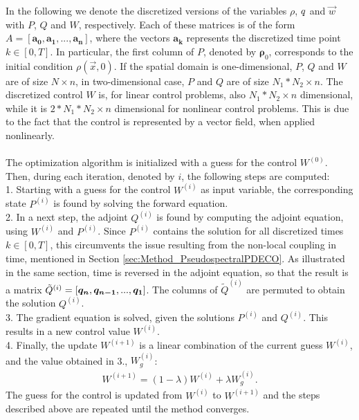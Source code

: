 In the following we denote the discretized versions of the variables $\rho$, $q$ and $\vec{w}$ with $P$, $Q$ and $W$, respectively. Each of these matrices is of the form $A = [\boldsymbol{a_0}, \boldsymbol{a_1}, ... ,\boldsymbol{a_n}]$, where the vectors $\boldsymbol{a_k}$ represents the discretized time point $k \in [0,T]$. In particular, the first column of $P$, denoted by $\boldsymbol{\rho}_0$, corresponds to the initial condition $\rho(\vec{x},0)$. If the spatial domain is one-dimensional, $P$, $Q$ and $W$ are of size $N \times n$, in two-dimensional case, $P$ and $Q$ are of size $N_1*N_2 \times n$. The discretized control $W$ is, for linear control problems, also $N_1*N_2 \times n$ dimensional, while it is $2*N_1*N_2 \times n$ dimensional for nonlinear control problems. This is due to the fact that the control is represented by a vector field, when applied nonlinearly.
\\
\\
The optimization algorithm is initialized with a guess for the control $W^{(0)}$. Then, during each iteration, denoted by $i$, the following steps are computed:\\
1. Starting with a guess for the control $W^{(i)}$ as input variable, the corresponding state $P^{(i)}$ is found by solving the forward equation.\\
2. In a next step, the adjoint $Q^{(i)}$ is found by computing the adjoint equation, using $W^{(i)}$ and $P^{(i)}$. Since $P^{(i)}$ contains the solution for all discretized times $k \in [0,T]$, this circumvents the issue resulting from the non-local coupling in time, mentioned in Section \ref{sec:Method_PseudospectralPDECO}. As illustrated in the same section, time is reversed in the adjoint equation, so that the result is a matrix $\tilde{Q}^{(i)} =  [\boldsymbol{q_n},\boldsymbol{q_{n-1}}, ..., \boldsymbol{q_1} ]$. The columns of $\tilde{Q}^{(i)}$ are permuted to obtain the solution  $Q^{(i)}$.\\
3. The gradient equation is solved, given the solutions $P^{(i)}$ and $Q^{(i)}$. This results in a new control value $W^{(i)}$. \\
4. Finally, the update $W^{(i+1)}$ is a linear combination of the current guess $W^{(i)}$, and the value obtained in 3., $W^{(i)}_{g}$:
\begin{align*}
W^{(i+1)} = (1-\lambda)W^{(i)} + \lambda W^{(i)}_{g}.
\end{align*}
The guess for the control is updated from $W^{(i)} $ to $W^{(i+1)} $ and the steps described above are repeated until the method converges. 
